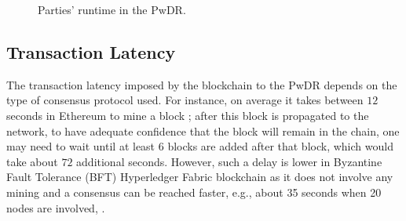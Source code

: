 \begin{figure}[!htb]
\centering
{}
\vspace{-4mm}
\caption{\small Parties' runtime in the PwDR.}\label{plot::runtime}
\vspace{-5mm}
\end{figure}

\vspace{-3mm}
\subsection{Transaction Latency}
\vspace{-1mm}

The transaction latency imposed by the blockchain to the PwDR depends on the type of consensus protocol used. For instance, on average it takes between  $12$ seconds in Ethereum to mine a block \cite{EyalGSR16}; after this block is propagated to the network, to have adequate confidence that the block will remain in the chain, one may need to wait until at least $6$ blocks are added after that block, which would take about $72$ additional seconds. However, such a delay is lower in Byzantine Fault Tolerance (BFT) Hyperledger Fabric blockchain as it does not involve any mining and a consensus can be reached faster, e.g., about 35 seconds when 20 nodes are involved, \cite{Hyperledger-Metrics}. 







